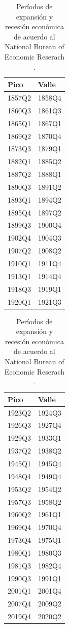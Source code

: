 \documentclass[titlepage, 12pt]{article}
\begin{document}
\begin{table}
    \centering
    \begin{tabular}{ll}
        \toprule
        Pico   & Valle  \\
        \midrule
        1857Q2 & 1858Q4 \\
        1860Q3 & 1861Q3 \\
        1865Q1 & 1867Q1 \\
        1869Q2 & 1870Q4 \\
        1873Q3 & 1879Q1 \\
        1882Q1 & 1885Q2 \\
        1887Q2 & 1888Q1 \\
        1890Q3 & 1891Q2 \\
        1893Q1 & 1894Q2 \\
        1895Q4 & 1897Q2 \\
        1899Q3 & 1900Q4 \\
        1902Q4 & 1904Q3 \\
        1907Q2 & 1908Q2 \\
        1910Q1 & 1911Q4 \\
        1913Q1 & 1914Q4 \\
        1918Q3 & 1919Q1 \\
        1920Q1 & 1921Q3 \\
        \bottomrule
    \end{tabular}
    \begin{tabular}{ll}
        \toprule
        Pico   & Valle  \\
        \midrule
        1923Q2 & 1924Q3 \\
        1926Q3 & 1927Q4 \\
        1929Q3 & 1933Q1 \\
        1937Q2 & 1938Q2 \\
        1945Q1 & 1945Q4 \\
        1948Q4 & 1949Q4 \\
        1953Q2 & 1954Q2 \\
        1957Q3 & 1958Q2 \\
        1960Q2 & 1961Q1 \\
        1969Q4 & 1970Q4 \\
        1973Q4 & 1975Q1 \\
        1980Q1 & 1980Q3 \\
        1981Q3 & 1982Q4 \\
        1990Q3 & 1991Q1 \\
        2001Q1 & 2001Q4 \\
        2007Q4 & 2009Q2 \\
        2019Q4 & 2020Q2 \\
        \bottomrule
    \end{tabular}
    \caption{Períodos de expansión y recesión económica de acuerdo al National Bureau of Economic Reserach \autocite{nber2023}.}
\end{table}
\end{document}
